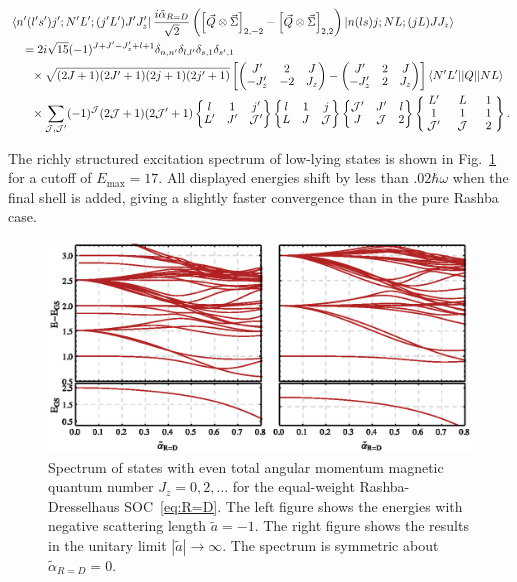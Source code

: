 \begin{equation}\begin{split}
&\bra{n'(l's')j';N'L';(j'L')J'J'_z}  \frac{i \tilde{\alpha}_{R=D}}{\sqrt{2}}\left(  \left[ \vec{Q} \otimes \vec{\Sigma} \right]_{2,-2} -  \left[ \vec{Q} \otimes \vec{\Sigma} \right]_{2,2} \right)  \ket{n(ls)j;NL;(jL)JJ_z}   \\
&\quad=2 i \sqrt{15}(-1)^{J+J'-J'_z+l+1}\delta_{n,n'}\delta_{l,l'}\delta_{s,1}\delta_{s',1}  \\
 &\quad\hphantom{=}\times \sqrt{(2J+1)(2J'+1)(2j+1)(2j'+1)} \left[\threej{J'}{2}{J}{-J'_z}{-2}{J_z}-\threej{J'}{2}{J}{-J'_z}{2}{J_z}\right] \braket{N' L' || Q || N L} \\ 
 &\quad\hphantom{=}\times\sum_{\mathcal{J},\mathcal{J}'} (-1)^\mathcal{J}(2\mathcal{J}+1)(2\mathcal{J}'+1)\sixj{l}{1}{j'}{L'}{J'}{\mathcal{J}'}\sixj{l}{1}{j}{L}{J}{\mathcal{J}}\sixj{\mathcal{J}'}{J'}{l}{J}{\mathcal{J}}{2}
 \renewcommand{\arraystretch}{0.9}
 \ninej{\hphantom{l}L'\hphantom{l}}{\hphantom{l}L\hphantom{l}}{\hphantom{l}1\hphantom{l}}{1}{1}{1}{\mathcal{J}'}{\mathcal{J}}{2} .
\end{split}
\end{equation}

The richly structured excitation spectrum of low-lying states is shown in Fig.~\ref{fig:R=DExcitationSpectrum} for a cutoff of $E_{\text{max}}=17$. All displayed energies shift by less than .$02\hbar\omega$ when the final shell is added, giving a slightly faster convergence than in the pure Rashba case.

\begin{figure}
\includegraphics{SOC/Figures/RashbaDresselhausSpectrum}
\caption[Spectrum of states with even total angular momentum magnetic quantum number $J_z=0,2,\dots$ for the equal-weight Rashba-Dresselhaus coupling]{\label{fig:R=DExcitationSpectrum} 
Spectrum of states with even total angular momentum magnetic quantum number $J_z=0,2,\dots$ for the equal-weight Rashba-Dresselhaus SOC~\eqref{eq:R=D}. The left figure shows the energies with negative scattering length $\tilde{a}=-1$. The right figure shows the results in the unitary limit $|\tilde{a}|\rightarrow\infty$. The spectrum is symmetric about $\tilde{\alpha}_{R=D}=0$.} 
\end{figure}


